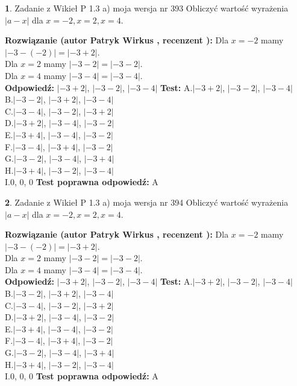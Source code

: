 \documentclass[12pt, a4paper]{article}
\theoremstyle{definition} %
\newtheorem{zad}{}
\newcommand{\zadStart}[1]{\begin{zad}#1\newline}
\newcommand{\zadStop}{\end{zad}}
\newcommand{\rozwStart}[2]{\noindent \textbf{Rozwiązanie (autor #1 , recenzent #2): }\newline}
\newcommand{\rozwStop}{\newline}
\newcommand{\odpStart}{\noindent \textbf{Odpowiedź:}\newline}
\newcommand{\odpStop}{\newline}
\newcommand{\testStart}{\noindent \textbf{Test:}\newline}
\newcommand{\testStop}{\newline}
\newcommand{\kluczStart}{\noindent \textbf{Test poprawna odpowiedź:}\newline}
\newcommand{\kluczStop}{\newline}
\begin{document}
\zadStart{Zadanie z Wikieł P 1.3 a) moja wersja nr 393}
Obliczyć wartość wyrażenia $|a - x|$ dla $x=-2,x=2,x=4$.
\zadStop
\rozwStart{Patryk Wirkus}{}
Dla $x = -2$ mamy $|-3 - (-2)| = |-3 + 2|$.\\
Dla $x = 2$ mamy $|-3 - 2| = |-3 - 2|$.\\
Dla $x = 4$ mamy $|-3 - 4| = |-3 - 4|$.\\
\rozwStop
\odpStart
$|-3 + 2|$, $|-3 - 2|$, $|-3 - 4|$
\odpStop
\testStart
A.$|-3 + 2|$, $|-3 - 2|$, $|-3 - 4|$\\
B.$|-3 - 2|$, $|-3 + 2|$, $|-3 - 4|$\\
C.$|-3 - 4|$, $|-3 - 2|$, $|-3 + 2|$\\
D.$|-3 + 2|$, $|-3 - 4|$, $|-3 - 2|$\\
E.$|-3 + 4|$, $|-3 - 4|$, $|-3 - 2|$\\
F.$|-3 - 4|$, $|-3 + 4|$, $|-3 - 2|$\\
G.$|-3 - 2|$, $|-3 - 4|$, $|-3 + 4|$\\
H.$|-3 + 4|$, $|-3 - 2|$, $|-3 - 4|$\\
I.$0$, $0$, $0$
\testStop
\kluczStart
A
\kluczStop



\zadStart{Zadanie z Wikieł P 1.3 a) moja wersja nr 394}
Obliczyć wartość wyrażenia $|a - x|$ dla $x=-2,x=2,x=4$.
\zadStop
\rozwStart{Patryk Wirkus}{}
Dla $x = -2$ mamy $|-3 - (-2)| = |-3 + 2|$.\\
Dla $x = 2$ mamy $|-3 - 2| = |-3 - 2|$.\\
Dla $x = 4$ mamy $|-3 - 4| = |-3 - 4|$.\\
\rozwStop
\odpStart
$|-3 + 2|$, $|-3 - 2|$, $|-3 - 4|$
\odpStop
\testStart
A.$|-3 + 2|$, $|-3 - 2|$, $|-3 - 4|$\\
B.$|-3 - 2|$, $|-3 + 2|$, $|-3 - 4|$\\
C.$|-3 - 4|$, $|-3 - 2|$, $|-3 + 2|$\\
D.$|-3 + 2|$, $|-3 - 4|$, $|-3 - 2|$\\
E.$|-3 + 4|$, $|-3 - 4|$, $|-3 - 2|$\\
F.$|-3 - 4|$, $|-3 + 4|$, $|-3 - 2|$\\
G.$|-3 - 2|$, $|-3 - 4|$, $|-3 + 4|$\\
H.$|-3 + 4|$, $|-3 - 2|$, $|-3 - 4|$\\
I.$0$, $0$, $0$
\testStop
\kluczStart
A
\kluczStop
\end{document}
